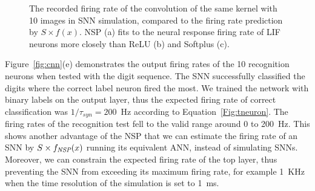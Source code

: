 \begin{figure}[tbh!]
\begin{subfigure}[t]{0.6\textwidth}
		\end{subfigure}
		\caption{
			The recorded firing rate of the convolution of the same kernel with 10 images in SNN simulation, compared to the firing rate prediction by $S \times f(x)$.
			NSP (a) fits to the neural response firing rate of LIF neurons more closely than ReLU (b) and Softplus (c).}
		\label{fig:af_compare}
	\end{figure}

	Figure~\ref{fig:cnn}(e) demonstrates the output firing rates of the 10 recognition neurons when tested with the digit sequence.
	The SNN successfully classified the digits where the correct label neuron fired the most.
	We trained the network with binary labels on the output layer, thus the expected firing rate of correct classification was $1/\tau_{syn}=200$~Hz according to Equation~\ref{Fig:tneuron}.
	The firing rates of the recognition test fell to the valid range around 0 to 200~Hz.
	This shows another advantage of the NSP that we can estimate the firing rate of an SNN by $S \times f_{\textit{\textrm{NSP}}}(x)$ running its equivalent ANN, instead of simulating SNNs.
	Moreover, we can constrain the expected firing rate of the top layer, thus preventing the SNN from exceeding its maximum firing rate, for example 1~KHz when the time resolution of the simulation is set to 1~ms.


